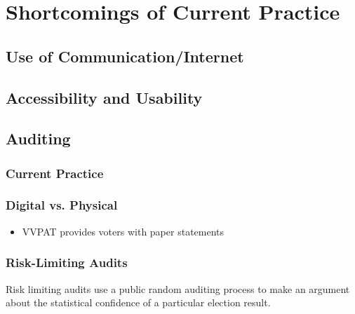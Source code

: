 \section{Shortcomings of Current Practice}
\subsection{Use of Communication/Internet}
\subsection{Accessibility and Usability}
\subsection{Auditing}
\subsubsection{Current Practice}
\subsubsection{Digital vs. Physical}
\begin{itemize}
\item VVPAT provides voters with paper statements
\end{itemize}
\subsubsection{Risk-Limiting Audits}
Risk limiting audits use a public random auditing process to make an argument about the statistical confidence of a particular election result.
